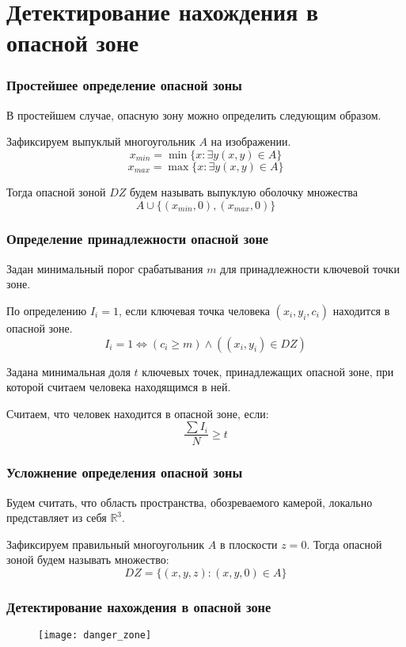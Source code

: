 \section{Детектирование нахождения в опасной зоне}
\begin{frame}
    \frametitle{Простейшее определение опасной зоны}
    В простейшем случае, опасную зону можно определить следующим образом.

    Зафиксируем выпуклый многоугольник $A$ на изображении.
    $$ x_{min} = \min\{ x : \exists y (x, y) \in A\} $$
    $$ x_{max} = \max\{ x : \exists y (x, y) \in A\} $$

    Тогда опасной зоной $DZ$ будем называть выпуклую оболочку множества
    $$ A \cup \{(x_{min}, 0), (x_{max}, 0)\} $$
\end{frame}

\begin{frame}
    \frametitle{Определение принадлежности опасной зоне}
    Задан минимальный порог срабатывания $m$ для принадлежности ключевой точки зоне.

    По определению $I_i = 1$, если ключевая точка человека $\left(x_i, y_i, c_i\right)$ находится в опасной зоне.
    $$ I_i = 1 \iff \left(c_i \ge m\right) \wedge \left(\left(x_i, y_i\right) \in DZ\right) $$

    Задана минимальная доля $t$ ключевых точек, принадлежащих опасной зоне, при которой считаем человека находящимся в ней.

    Считаем, что человек находится в опасной зоне, если:
    $$ \frac{\sum I_i}{N} \ge t $$
\end{frame}

\begin{frame}
    \frametitle{Усложнение определения опасной зоны}
    Будем считать, что область пространства, обозреваемого камерой, локально представляет из себя $\mathbb{R}^3$.

    Зафиксируем правильный многоугольник $A$ в плоскости $z = 0$.
    Тогда опасной зоной будем называть множество:
    $$DZ = \{(x, y, z) : (x, y, 0) \in A\} $$
\end{frame}

\begin{frame}
    \frametitle{Детектирование нахождения в опасной зоне}
    \begin{figure}
        \centering
        \texttt{[image: danger\_zone]}
    \end{figure}
\end{frame}

